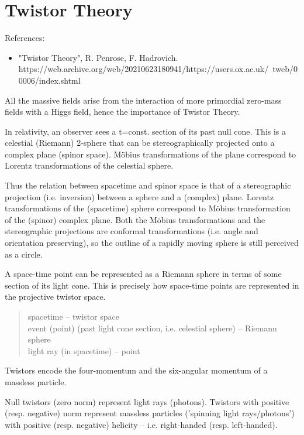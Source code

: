 \chapter{Twistor Theory}

References:

\begin{itemize}
	\item "Twistor Theory", R. Penrose, F. Hadrovich. \newline https://web.archive.org/web/20210623180941/https://users.ox.ac.uk/~tweb/00006/index.shtml
\end{itemize}

All the massive fields arise from the interaction of more primordial zero-mass fields with a Higgs field, hence the importance of Twistor Theory.

In relativity, an observer sees a t=const. section of its past null cone. This is a celestial (Riemann) 2-sphere that can be stereographically projected onto a complex plane (spinor space). Möbius transformations of the plane correspond to Lorentz transformations of the celestial sphere.

Thus the relation between spacetime and spinor space is that of a stereographic projection (i.e. inversion) between a sphere and a (complex) plane. Lorentz transformations of the (spacetime) sphere correspond to Möbius transformation of the (spinor) complex plane. Both the Möbius transformations and the stereographic projections are conformal transformations (i.e. angle and orientation preserving), so the outline of a rapidly moving sphere is still perceived as a circle.

A space-time point can be represented as a Riemann sphere in terms of some section of its light cone. This is precisely how space-time points are represented in the projective twistor space.

\begin{verse}
	spacetime -- twistor space \\
	event (point) (past light cone section, i.e. celestial sphere) -- Riemann sphere \\
	light ray (in spacetime) -- point 
\end{verse}

Twistors encode the four-momentum and the six-angular momentum of a massless particle.

Null twistors (zero norm) represent light rays (photons). Twistors with positive (resp. negative) norm represent massless particles ('spinning light rays/photons') with positive (resp. negative) helicity -- i.e. right-handed (resp. left-handed).

